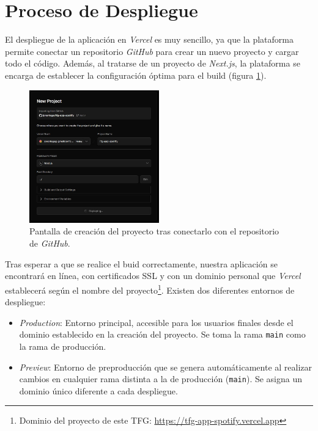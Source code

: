 \section{Proceso de Despliegue}

El despliegue de la aplicación en \textit{Vercel} es muy sencillo, ya que la plataforma permite conectar un repositorio \textit{GitHub} para crear un nuevo proyecto y cargar todo el código. Además, al tratarse de un proyecto de \textit{Next.js}, la plataforma se encarga de establecer la configuración óptima para el build (figura \ref{fig:creacion_proyecto}).

\begin{figure}[H]
    \centering
    \includegraphics[width=0.5\textwidth]{figures/despliegue/creacion_proyecto.jpg}
    \vspace{0.3cm}
    \caption{Pantalla de creación del proyecto tras conectarlo con el repositorio de \textit{GitHub}.}
    \label{fig:creacion_proyecto}
\end{figure}

Tras esperar a que se realice el buid correctamente, nuestra aplicación se encontrará en línea, con certificados SSL y con un dominio personal que \textit{Vercel} establecerá según el nombre del proyecto\footnote{Dominio del proyecto de este TFG: \href{https://tfg-app-spotify.vercel.app}{https://tfg-app-spotify.vercel.app}}. Existen dos diferentes entornos de despliegue:

\begin{itemize}
    \item \textit{Production}: Entorno principal, accesible para los usuarios finales desde el dominio establecido en la creación del proyecto. Se toma la rama \texttt{main} como la rama de producción.
    \item \textit{Preview}: Entorno de preproducción que se genera automáticamente al realizar cambios en cualquier rama distinta a la de producción (\texttt{main}). Se asigna un dominio único diferente a cada despliegue.
\end{itemize}

